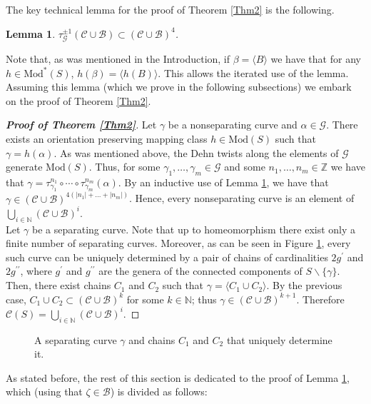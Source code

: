 \documentclass[twoside,11pt,a4paper]{article}
\newtheorem{Lema}[Def]{Lemma}
\newcommand*{\ccomp}[1]{\mathcal{C}(#1)}
\newcommand*{\Mod}[1]{\mathrm{Mod}(#1)}
\newcommand*{\EMod}[1]{\mathrm{Mod}^{*}(#1)}
\newcommand*{\nat}{\mathbb{N}}
\newcommand*{\Cf}{\mathscr{C}}
\newcommand*{\Bf}{\mathscr{B}}
\newcommand*{\Gf}{\mathscr{G}}
\newcommand*{\biprime}{\prime\prime}
\begin{document}
\indent The key technical lemma for the proof of Theorem \ref{Thm2} is the following.
\begin{Lema}\label{CUBen4}
 $\tau_{\Gf}^{\pm 1}(\Cf \cup \Bf) \subset (\Cf \cup \Bf)^{4}$.
\end{Lema}
\indent Note that, as was mentioned in the Introduction, if $\beta = \langle B \rangle$ we have that for any $h \in \EMod{S}$, $h(\beta) = \langle h(B) \rangle$. This allows the iterated use of the lemma.\\
\indent Assuming this lemma (which we prove in the following subsections) we embark on the proof of Theorem \ref{Thm2}.
\begin{proof}[\textbf{Proof of Theorem \ref{Thm2}}]
\indent Let $\gamma$ be a nonseparating curve and $\alpha \in \Gf$. There exists an orientation preserving mapping class $h \in \Mod{S}$ such that $\gamma = h(\alpha)$. As was mentioned above, the Dehn twists along the elements of $\Gf$ generate $\Mod{S}$. Thus, for some $\gamma_{1}, \ldots, \gamma_{m} \in \Gf$ and some $n_{1}, \ldots, n_{m} \in \mathbb{Z}$ we have that $\gamma = \tau_{\gamma_{1}}^{n_{1}} \circ \cdots \circ \tau_{\gamma_{m}}^{n_{m}}(\alpha)$. By an inductive use of Lemma \ref{CUBen4}, we have that $\gamma \in (\Cf \cup \Bf)^{4(|n_{1}| + \ldots + |n_{m}|)}$. Hence, every nonseparating curve is an element of $\bigcup_{i \in \nat} (\Cf \cup \Bf)^{i}$.\\
\indent Let $\gamma$ be a separating curve. Note that up to homeomorphism there exist only a finite number of separating curves. Moreover, as can be seen in Figure \ref{ChainsProofFig}, every such curve can be uniquely determined by a pair of chains of cardinalities $2g^{\prime}$ and $2g^{\biprime}$, where $g^{\prime}$ and $g^{\biprime}$ are the genera of the connected components of $S \backslash \{\gamma\}$. Then, there exist chains $C_{1}$ and $C_{2}$ such that $\gamma = \langle C_{1} \cup C_{2}\rangle$. By the previous case, $C_{1} \cup C_{2} \subset (\Cf \cup \Bf)^{k}$ for some $k \in \nat$; thus $\gamma \in (\Cf \cup \Bf)^{k+1}$. Therefore $\ccomp{S} = \bigcup_{i \in \nat} (\Cf \cup \Bf)^{i}$.
\end{proof}
\begin{figure}
 \begin{center}
  \resizebox{9cm}{!}{}
 \end{center}\caption{A separating curve $\gamma$ and chains $C_{1}$ and $C_{2}$ that uniquely determine it.}\label{ChainsProofFig}
\end{figure}
\indent As stated before, the rest of this section is dedicated to the proof of Lemma \ref{CUBen4}, which (using that $\zeta \in \Bf$) is divided as follows:\\
\end{document}
